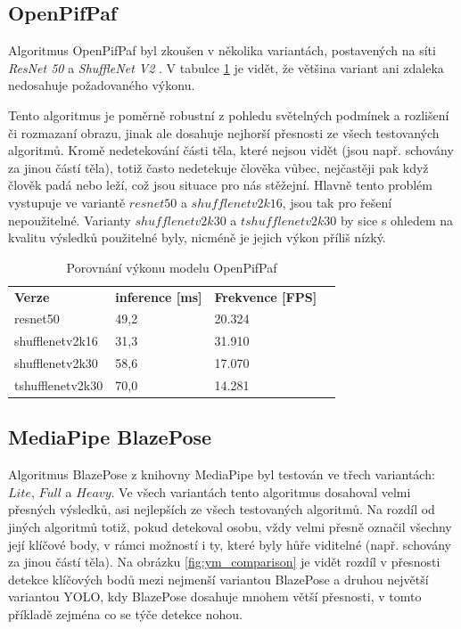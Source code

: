 \subsection{OpenPifPaf}

Algoritmus OpenPifPaf byl zkoušen v několika variantách, postavených na síti
\textit{ResNet 50} a \textit{ShuffleNet V2} \cite{shufflenetv2}. V tabulce
\ref{tab:openpifpaf_performance} je vidět, že většina variant ani zdaleka
nedosahuje požadovaného výkonu.

Tento algoritmus je poměrně robustní z pohledu světelných podmínek a rozlišení
či rozmazaní obrazu, jinak ale dosahuje nejhorší přesnosti ze všech testovaných
algoritmů. Kromě nedetekování části těla, které nejsou vidět (jsou např.
schovány za jinou částí těla), totiž často nedetekuje člověka vůbec, nejčastěji
pak když člověk padá nebo leží, což jsou situace pro nás stěžejní. Hlavně tento
problém vystupuje ve variantě $resnet50$ a $shufflenetv2k16$, jsou tak pro
řešení nepoužitelné. Varianty $shufflenetv2k30$ a $tshufflenetv2k30$ by sice s
ohledem na kvalitu výsledků použitelné byly, nicméně je jejich výkon příliš
nízký.

\begin{table}[htbp]
    \centering
    \caption{Porovnání výkonu modelu OpenPifPaf}
    \label{tab:openpifpaf_performance}
    \begin{tabular}{|l|l|l|l|}
        \hline
        \textbf{Verze}   & \textbf{inference [ms]} & \textbf{Frekvence [FPS]} \\
        resnet50         & 49,2                    & 20.324                   \\ \hline
        shufflenetv2k16  & 31,3                    & 31.910                   \\ \hline
        shufflenetv2k30  & 58,6                    & 17.070                   \\ \hline
        tshufflenetv2k30 & 70,0                    & 14.281                   \\ \hline
    \end{tabular}
\end{table}

\subsection{MediaPipe BlazePose}

Algoritmus BlazePose z knihovny MediaPipe byl testován ve třech variantách:
$Lite$, $Full$ a $Heavy$. Ve všech variantách tento algoritmus dosahoval velmi
přesných výsledků, asi nejlepších ze všech testovaných algoritmů. Na rozdíl od
jiných algoritmů totiž, pokud detekoval osobu, vždy velmi přesně označil
všechny její klíčové body, v rámci možností i ty, které byly hůře viditelné
(např. schovány za jinou částí těla). Na obrázku \ref{fig:ym_comparison} je
vidět rozdíl v přesnosti detekce klíčových bodů mezi nejmenší variantou
BlazePose a druhou největší variantou YOLO, kdy BlazePose dosahuje mnohem větší
přesnosti, v tomto příkladě zejména co se týče detekce nohou.

